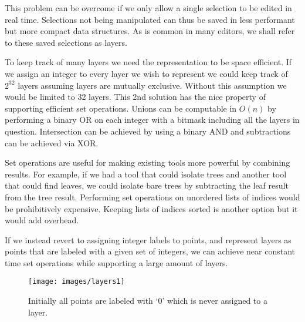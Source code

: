 This problem can be overcome if we only allow a single selection to be edited in real time. Selections not being manipulated can thus be saved in less performant but more compact data structures. As is common in many editors, we shall refer to these saved selections as layers.

To keep track of many layers we need the representation to be space efficient. If we assign an integer to every layer we wish to represent we could keep track of $2^{32}$ layers assuming layers are mutually exclusive. Without this assumption we would be limited to 32 layers. This 2nd solution has the nice property of supporting efficient set operations. Unions can be computable in $O(n)$ by performing a binary OR on each integer with a bitmask including all the layers in question. Intersection can be achieved by using a binary AND and subtractions can be achieved via XOR.

Set operations are useful for making existing tools more powerful by combining results. For example, if we had a tool that could isolate trees and another tool that could find leaves, we could isolate bare trees by subtracting the leaf result from the tree result. Performing set operations on unordered lists of indices would be prohibitively expensive. Keeping lists of indices sorted is another option but it would add overhead.

If we instead revert to assigning integer labels to points, and represent layers as points that are labeled with a given set of integers, we can achieve near constant time set operations while supporting a large amount of layers.

\begin{figure}[ht]
	\centering
	\texttt{[image: images/layers1]}
	\caption[Initial label state]{ Initially all points are labeled with `0' which is never assigned to a layer. \label{fig:layer1}}
\end{figure}

